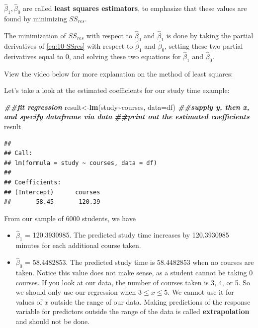\documentclass[
]{book}
\newenvironment{Shaded}{\begin{snugshade}}{\end{snugshade}}
\newcommand{\AttributeTok}[1]{\textcolor[rgb]{0.13,0.29,0.53}{#1}}
\newcommand{\DocumentationTok}[1]{\textcolor[rgb]{0.56,0.35,0.01}{\textbf{\textit{#1}}}}
\newcommand{\FunctionTok}[1]{\textcolor[rgb]{0.13,0.29,0.53}{\textbf{#1}}}
\newcommand{\NormalTok}[1]{#1}
\newcommand{\OtherTok}[1]{\textcolor[rgb]{0.56,0.35,0.01}{#1}}
\newcommand{\SpecialCharTok}[1]{\textcolor[rgb]{0.81,0.36,0.00}{\textbf{#1}}}
\providecommand{\tightlist}{%
  \setlength{\itemsep}{0pt}\setlength{\parskip}{0pt}}
\begin{document}
\(\hat{\beta}_1, \hat{\beta}_0\) are called \textbf{least squares estimators}, to emphasize that these values are found by minimizing \(SS_{res}\).

The minimization of \(SS_{res}\) with respect to \(\hat{\beta}_0\) and \(\hat{\beta}_1\) is done by taking the partial derivatives of \eqref{eq:10-SSres} with respect to \(\hat{\beta}_1\) and \(\hat{\beta}_0\), setting these two partial derivatives equal to 0, and solving these two equations for \(\hat{\beta}_1\) and \(\hat{\beta}_0\).

View the video below for more explanation on the method of least squares:

Let's take a look at the estimated coefficients for our study time example:

\begin{Shaded}
\begin{Highlighting}[]
\DocumentationTok{\#\#fit regression}
\NormalTok{result}\OtherTok{\textless{}{-}}\FunctionTok{lm}\NormalTok{(study}\SpecialCharTok{\textasciitilde{}}\NormalTok{courses, }\AttributeTok{data=}\NormalTok{df) }\DocumentationTok{\#\#supply y, then x, and specify dataframe via data}
\DocumentationTok{\#\#print out the estimated coefficients}
\NormalTok{result}
\end{Highlighting}
\end{Shaded}

\begin{verbatim}
## 
## Call:
## lm(formula = study ~ courses, data = df)
## 
## Coefficients:
## (Intercept)      courses  
##       58.45       120.39
\end{verbatim}

From our sample of 6000 students, we have

\begin{itemize}
\tightlist
\item
  \(\hat{\beta}_1\) = 120.3930985. The predicted study time increases by 120.3930985 minutes for each additional course taken.
\item
  \(\hat{\beta}_0\) = 58.4482853. The predicted study time is 58.4482853 when no courses are taken. Notice this value does not make sense, as a student cannot be taking 0 courses. If you look at our data, the number of courses taken is 3, 4, or 5. So we should only use our regression when \(3 \leq x \leq 5\). We cannot use it for values of \(x\) outside the range of our data. Making predictions of the response variable for predictors outside the range of the data is called \textbf{extrapolation} and should not be done.
\end{itemize}
\end{document}
